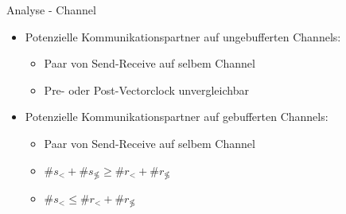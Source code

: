 \documentclass[aspectratio=169]{beamer}  %
\begin{document}
\begin{frame}{Analyse - Channel}
  \begin{itemize}
    \item Potenzielle Kommunikationspartner auf ungebufferten Channels:
    \begin{itemize}
      \item Paar von Send-Receive auf selbem Channel
      \item Pre- oder Post-Vectorclock unvergleichbar
    \end{itemize}
    \item Potenzielle Kommunikationspartner auf gebufferten Channels:
    \begin{itemize}
      \item Paar von Send-Receive auf selbem Channel
      \item $\#s_< + \#s_{\not\lessgtr} \geq \# r_{<} + \#r_{\not \lessgtr}$\\
      \item $\#s_< \leq \# r_{<} + \#r_{\not \lessgtr}$
    \end{itemize}
  \end{itemize}
\end{frame}
\end{document}
